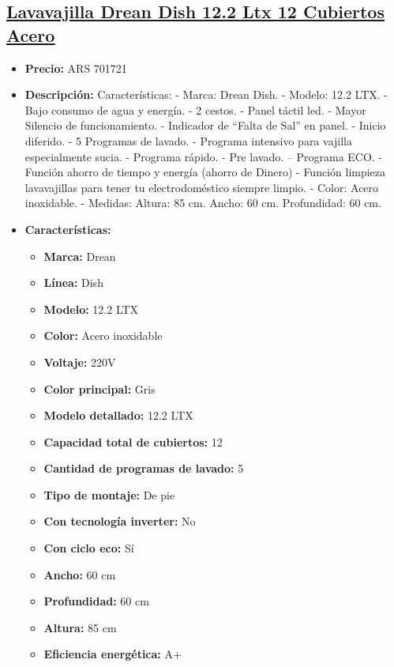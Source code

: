 \documentclass{article}
\begin{document}
\begin{adjustwidth}{2em}{}

\subsection{\uline{\href{https://www.mercadolibre.com.ar/lavavajilla-drean-dish-122-ltx-12-cubiertos-acero/p/MLA23619580}{Lavavajilla Drean Dish 12.2 Ltx 12 Cubiertos Acero}}}
\begin{itemize}
    \item \textbf{Precio:} ARS 701721
    \item \textbf{Descripción:} Características:
- Marca: Drean Dish.
- Modelo: 12.2 LTX.
- Bajo consumo de agua y energía.
- 2 cestos.
- Panel táctil led.
- Mayor Silencio de funcionamiento.
- Indicador de “Falta de Sal” en panel.
- Inicio diferido.
- 5 Programas de lavado.
- Programa intensivo para vajilla especialmente sucia.
- Programa rápido.
- Pre lavado.
– Programa ECO.
- Función ahorro de tiempo y energía (ahorro de Dinero)
- Función limpieza lavavajillas para tener tu electrodoméstico siempre limpio.
- Color: Acero inoxidable.
- Medidas: Altura: 85 cm. Ancho: 60 cm. Profundidad: 60 cm.
    \item \textbf{Características:} 
    \begin{itemize}
        \item \textbf {Marca:} Drean
    \item \textbf {Línea:} Dish
    \item \textbf {Modelo:} 12.2 LTX
    \item \textbf {Color:} Acero inoxidable
    \item \textbf {Voltaje:} 220V
    \item \textbf {Color principal:} Gris
    \item \textbf {Modelo detallado:} 12.2 LTX
    \item \textbf {Capacidad total de cubiertos:} 12
    \item \textbf {Cantidad de programas de lavado:} 5
    \item \textbf {Tipo de montaje:} De pie
    \item \textbf {Con tecnología inverter:} No
    \item \textbf {Con ciclo eco:} Sí
    \item \textbf {Ancho:} 60 cm
    \item \textbf {Profundidad:} 60 cm
    \item \textbf {Altura:} 85 cm
    \item \textbf {Eficiencia energética:} A+

\end{itemize}
\end{itemize}
\end{adjustwidth}
\end{document}
